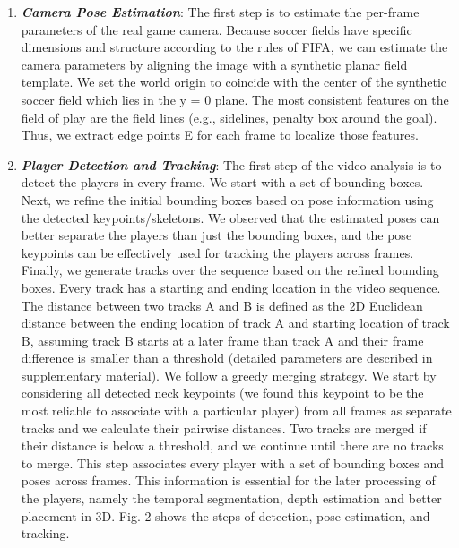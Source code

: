 \documentclass[11pt]{article}
\begin{document}
\begin{enumerate}
\item {\em \textbf{Camera Pose Estimation}}: The first step is to estimate the per-frame parameters of
the real game camera. Because soccer fields have specific
dimensions and structure according to the rules of FIFA, we
can estimate the camera parameters by aligning the image
with a synthetic planar field template. We set the world
origin to coincide with the center of the synthetic soccer
field which lies in the y = 0 plane. The most consistent features on the field of play are the
field lines (e.g., sidelines, penalty box around the goal).
Thus, we extract edge points E for each frame to localize
those features.

\item {\em \textbf{Player Detection and Tracking}}: The first step of the video analysis is to detect the players
in every frame. We start with a set of bounding boxes.
Next, we refine the initial bounding boxes based on pose information
using the detected keypoints/skeletons.
We observed that the estimated poses can better separate
the players than just the bounding boxes, and the pose keypoints
can be effectively used for tracking the players across
frames.
Finally, we generate tracks over the sequence based on
the refined bounding boxes.
Every track has a starting and
ending location in the video sequence. The distance between
two tracks A and B is defined as the 2D Euclidean
distance between the ending location of track A and starting
location of track B, assuming track B starts at a later
frame than track A and their frame difference is smaller
than a threshold (detailed parameters are described in supplementary
material). We follow a greedy merging strategy.
We start by considering all detected neck keypoints
(we found this keypoint to be the most reliable to associate
with a particular player) from all frames as separate tracks
and we calculate their pairwise distances. Two tracks are
merged if their distance is below a threshold, and we continue
until there are no tracks to merge. This step associates
every player with a set of bounding boxes and poses across
frames. This information is essential for the later processing
of the players, namely the temporal segmentation, depth estimation
and better placement in 3D.
Fig. 2 shows the steps
of detection, pose estimation, and tracking.


\end{enumerate}
\end{document}
